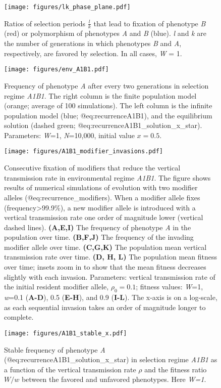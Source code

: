 

\begin{figure}
\centering
\texttt{[image: figures/lk\_phase\_plane.pdf]}
\caption{Ratios of selection periods \(\frac{l}{k}\) that lead to
fixation of phenotype \emph{B} (red) or polymorphism of phenotypes
\emph{A} and \emph{B} (blue). \emph{l} and \emph{k} are the number of
generations in which phenotypes \emph{B} and \emph{A}, respectively, are favored by
selection. In all cases, \emph{W} = 1.}\label{fig:lk_phase_plane}
\end{figure}

\begin{figure}
\centering
\texttt{[image: figures/env\_A1B1.pdf]}
\caption{Frequency of phenotype \emph{A} after every two generations in
selection regime \emph{A1B1}. The right column is the finite population model
(orange; average of 100 simulations). The left column is the infinite population model
(blue; @eq:recurrenceA1B1), and the equilibrium solution (dashed green;
@eq:recurrenceA1B1\_solution\_x\_star). Parameters: \emph{W}=1,
\emph{N}=10,000, initial value \(x=0.5\).}\label{fig:env_A1B1}
\end{figure}

\begin{figure}
\centering
\texttt{[image: figures/A1B1\_modifier\_invasions.pdf]}
\caption{Consecutive fixation of modifiers that reduce the vertical
transmission rate in environmental regime \emph{A1B1}. The figure shows
results of numerical simulations of evolution with two modifier alleles
(@eq:recurrence\_modifiers). When a modifier allele fixes
(frequency\textgreater{}99.9\%), a new modifier allele is introduced
with a vertical transmission rate one order of magnitude lower (vertical
dashed lines). \textbf{(A,E,I)} The frequency of phenotype \emph{A} in
the population over time. \textbf{(B,F,J)} The frequency of the invading
modifier allele over time. \textbf{(C,G,K)} The population mean vertical
transmission rate over time. \textbf{(D, H, L)} The population mean
fitness over time; insets zoom in to show that the mean fitness 
decreases slightly with each invasion. Parameters: vertical transmission rate of
the initial resident modifier allele, \(\rho_0 =0.1\); fitness values:
\emph{W}=1, \emph{w}=0.1 (\textbf{A-D}), 0.5 (\textbf{E-H}), and 0.9
(\textbf{I-L}). The x-axis is on a log-scale, as each sequential invasion
takes an order of magnitude longer to
complete.}\label{fig:A1B1_modifier_invasions}
\end{figure}

\begin{figure}
\centering
\texttt{[image: figures/A1B1\_stable\_x.pdf]}
\caption{Stable frequency of phenotype \emph{A}
(@eq:recurrenceA1B1\_solution\_x\_star) in selection regime \emph{A1B1}
as a function of the vertical transmission rate \(\rho\) and the fitness
ratio \(W/w\) between the favored and unfavored phenotypes. Here
\emph{W=1}.}\label{fig:A1B1_stable_x}
\end{figure}

